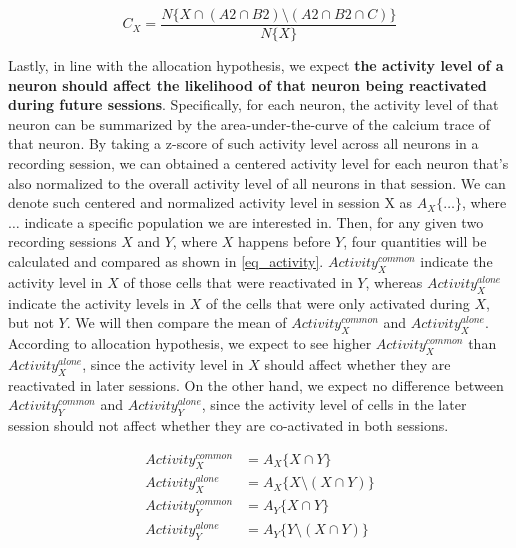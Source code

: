 \documentclass[master.tex]{subfiles}
\begin{document}
\begin{figure}
  \begin{equation} \label{eq_contrib} C_{X} = \frac{N\{X \cap (A2 \cap B2)
      \setminus (A2 \cap B2 \cap C)\}}{N\{X\}}
  \end{equation}
  \vspace{-15pt}
\end{figure}

Lastly, in line with the allocation hypothesis, we expect \textbf{the activity
  level of a neuron should affect the likelihood of that neuron being
  reactivated during future sessions}. Specifically, for each neuron, the
activity level of that neuron can be summarized by the area-under-the-curve of
the calcium trace of that neuron. By taking a z-score of such activity level
across all neurons in a recording session, we can obtained a centered activity
level for each neuron that's also normalized to the overall activity level of
all neurons in that session. We can denote such centered and normalized activity
level in session X as $A_X\{\ldots\}$, where $\ldots$ indicate a specific
population we are interested in. Then, for any given two recording sessions $X$
and $Y$, where $X$ happens before $Y$, four quantities will be calculated and
compared as shown in \autoref{eq_activity}. $Activity_{X}^{common}$ indicate the
activity level in $X$ of those cells that were reactivated in $Y$, whereas
$Activity_{X}^{alone}$ indicate the activity levels in $X$ of the cells that
were only activated during $X$, but not $Y$. We will then compare the mean of
$Activity_{X}^{common}$ and $Activity_{X}^{alone}$. According to allocation
hypothesis, we expect to see higher $Activity_{X}^{common}$ than
$Activity_{X}^{alone}$, since the activity level in $X$ should affect whether
they are reactivated in later sessions. On the other hand, we expect no
difference between $Activity_{Y}^{common}$ and $Activity_{Y}^{alone}$, since the
activity level of cells in the later session should not affect whether they are
co-activated in both sessions.

\begin{figure}
  \vspace{-15pt}
  \begin{align} \label{eq_activity}
    Activity_{X}^{common} & = A_X\{X \cap Y\} \nonumber \\
    Activity_{X}^{alone} & = A_X\{X \setminus (X \cap Y)\} \nonumber \\
    Activity_{Y}^{common} & = A_Y\{X \cap Y\} \nonumber \\
    Activity_{Y}^{alone} & = A_Y\{Y \setminus (X \cap Y)\}
  \end{align}
  \vspace{-25pt}
\end{figure}
\end{document}
